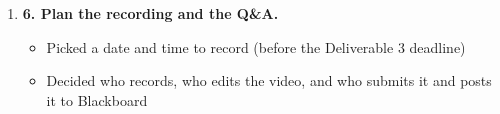 \documentclass[12pt]{article}
\begin{document}
\begin{enumerate}
    \item[$\square$] \textbf{6. Plan the recording and the Q\&A.}
    \begin{itemize}[nosep]
        \item[$\square$] Picked a date and time to record (before the Deliverable 3 deadline)
        \item[$\square$] Decided who records, who edits the video, and who submits it and posts it to Blackboard
    \end{itemize}
\end{enumerate}
\end{document}
